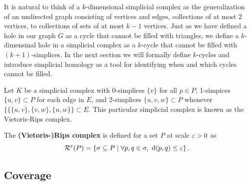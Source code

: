 It is natural to think of a $k$-dimensional simplicial complex as the generalization of an undirected graph consisting of vertices and edges, collections of at most 2 vertices, to collections of sets of at most $k-1$ vertices.
Just as we have defined a hole in our graph $G$ as a cycle that cannot be filled with triangles, we define a $k$-dimensinal hole in a simplicial complex as a $k$-cycle that cannot be filled with $(k+1)$-simplices.
In the next section we will formally define $k$-cycles and introduce simplicial homology as a tool for identifying when and which cycles cannot be filled.

Let $K$ be a simplicial complex with 0-simplices $\{v\}$ for all $p\in P$, 1-simpices $\{u, v\}\subset P$ for each edge in $E$, and 2-simplices $\{u,v,w\}\subset P$ whenever $\{\{\{u,v\},\{v,w\},\{u,w\}\}\subset E$.
This particular simplicial complex is known as the Vietoris-Rips complex.
\begin{definition}
    The \textbf{(Vietoris-)Rips complex} is defined for a set $P$ at scale $\varepsilon > 0$ as
    \[ \mathcal{R}^\varepsilon(P) = \left\{\sigma \subseteq P\mid \forall p,q\in\sigma,\ \mathrm{d}(p, q)\leq\varepsilon\right\}. \]
\end{definition}


\subsection{Coverage}

